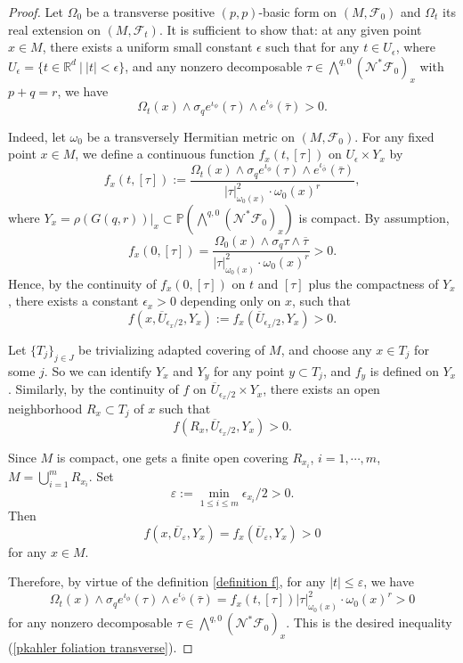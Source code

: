 \documentclass[12pt]{amsart}
\numberwithin{equation}{section}
\theoremstyle{definition}
\theoremstyle{definition}
\theoremstyle{definition}
\renewcommand{\1}{\mathsf{1}}
\renewcommand{\>}{\rightarrow}
\def\mc{\mathcal}
\theoremstyle{plain} %
\theoremstyle{plain} %
\theoremstyle{plain} %
\begin{document}
	\begin{proof}
		Let $\Omega_0$ be a transverse positive $(p,p)$-basic form on $(M,\mc F_0)$ and $\Omega_t$ its real extension on $(M,\mc F_t)$.
		It is sufficient to show that: at any given point $x\in M$, there exists a uniform small constant $\epsilon$ such that for any $t\in U_\epsilon$, where $U_{\epsilon}=\{t \in \mathbb{R}^d\ \big |\ |t|<\epsilon \}$,  and any nonzero decomposable  $\tau\in\bigwedge^{q,0}(\mc N^*\mc F_0)_x$ with $p+q=r$, we have
		\begin{equation}\label{pkahler foliation transverse}
			\Omega_{t}(x) \wedge \sigma_{q}e^{{\iota_{\phi}}}(\tau) \wedge e^{\iota_{\bar\phi}} (\bar\tau)>0.
		\end{equation}
		
		
		
		Indeed, let $\omega_0$ be a transversely Hermitian metric on $(M,\mc F_0)$. For any fixed point $x \in M$, we define a continuous function $f_{x}(t,[\tau])$ on $U_{\epsilon} \times Y_{x}$ by
		\begin{equation}\label{definition f}
			f_{x}(t,[\tau]):=\frac{	\Omega_{t}(x) \wedge \sigma_{q} e^{\iota_\phi}(\tau) \wedge e^{\iota_{\bar\phi}} (\bar\tau)}{|\tau|_{\omega_0(x)}^{2} \cdot \omega_0(x)^{r}},
		\end{equation}
		where $Y_{x}=\left.\rho(G(q, r))\right|_{x} \subset \mathbb P\left(\bigwedge^{q,0}(\mc N^*\mc F_0)_x\right)$ is compact.  By assumption, $$f_{x}(0,[\tau])=\frac{	\Omega_{0}(x) \wedge \sigma_{q} \tau\wedge \overline\tau }{|\tau|_{\omega_0(x)}^{2} \cdot \omega_0(x)^{r}}>0.
		$$
		Hence, by the continuity of $f_{x}(0,[\tau])$ on $t$ and $[\tau]$ plus the compactness of $Y_x$, there exists a constant $\epsilon_x>0$ depending only on $x$, such that
		$$\label{12}
		f(x,\overline{U}_{\epsilon_x/2},Y_x):=f_{x}(\overline{U}_{\epsilon_x/2},Y_x)>0.
		$$
		
		Let   $\{T_j\}_{j\in J}$ be trivializing adapted covering of $M$,
		and choose any $x\in T_j$ for some $j$. So we can identify $Y_x$ and $Y_y$ for any point $y\subset T_j$, and $f_y$ is defined on $Y_x$.
		Similarly,   by the continuity of $f$ on $\overline{U}_{\epsilon_x/2}\times Y_x$, there exists an open neighborhood $R_x\subset T_j$ of $x$ such that
		$$
		f(R_x, \overline{U}_{\epsilon_x/2},Y_x)>0.
		$$
		
		
		Since $M$ is compact, one gets a finite open covering $R_{x_i}$, $i=1,\cdots, m$, $M=\mathop\bigcup_{i=1}^m R_{x_i}$. Set
		$$\varepsilon:=\min_{1\leq i\leq m}\epsilon_{x_i}/2>0.$$
		Then
		$$
		f(x,\overline{U}_{\varepsilon},Y_x)=f_x(\overline{U}_{\varepsilon},Y_x)>0
		$$
		for any $x\in M$.
		
		
		Therefore,  by virtue of  the definition \eqref{definition f},
		for any $|t|\leq \varepsilon$, we have
		$$
		\Omega_{t}(x) \wedge \sigma_{q} e^{\iota_\phi}(\tau) \wedge e^{\iota_{\bar\phi}} (\bar\tau)=f_{x}(t,[\tau])|\tau|^2_{\omega_0(x)}\cdot \omega_0(x)^r>0
		$$
		for any nonzero decomposable $\tau\in \bigwedge^{q,0}(\mc N^*\mc F_0)_x$. This is the desired inequality (\ref{pkahler foliation transverse}).
		
	\end{proof}
	
\end{document}
